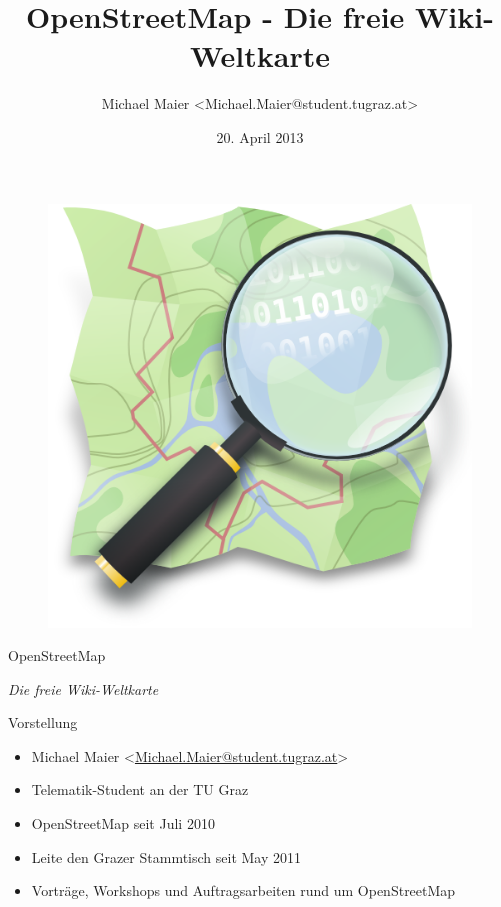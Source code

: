 \documentclass{beamer}
\title{OpenStreetMap - Die freie Wiki-Weltkarte}
\author{Michael Maier \textless Michael.Maier@student.tugraz.at\textgreater}
\date{20. April 2013}
\begin{document}

\begin{frame} 


\begin{figure}
  \centering
  \includegraphics[width=.5\textwidth]{mag_map.png}
\end{figure}

\begin{center}
\Huge{OpenStreetMap\\}
\end{center}

\begin{center}
\Large{\emph{Die freie Wiki-Weltkarte}}
\end{center}

\end{frame}



\begin{frame}{Vorstellung}

  \begin{itemize}
    \item Michael Maier \textless \href{mailto:Michael.Maier@student.tugraz.at}{Michael.Maier@student.tugraz.at}\textgreater
    \item Telematik-Student an der TU Graz 
    \item OpenStreetMap seit Juli 2010
    \item Leite den Grazer Stammtisch seit May 2011
    \item Vorträge, Workshops und Auftragsarbeiten rund um OpenStreetMap
  \end{itemize}
\end{frame}
\end{document}
